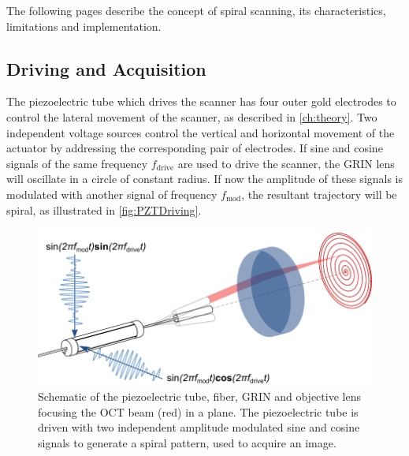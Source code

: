 The following pages describe the concept of spiral scanning, its characteristics, limitations and implementation.

\subsection{Driving and Acquisition}
The piezoelectric tube which drives the scanner has four outer gold electrodes to control the lateral movement of the scanner, as described in \autoref{ch:theory}. Two independent voltage sources control the vertical and horizontal movement of the actuator by addressing the corresponding pair of electrodes. If sine and cosine signals of the same frequency $f_\mathrm{drive}$ are used to drive the scanner, the GRIN lens will oscillate in a circle of constant radius. If now the amplitude of these signals is modulated with another signal of frequency $f_\mathrm{mod}$, the resultant trajectory will be spiral, as illustrated in \autoref{fig:PZTDriving}.

\begin{figure}[h!]\centering \includegraphics{figures/30_DesignSimulation/spiralScanning/PZTDrivingMoving.pdf}
      \caption{Schematic of the piezoelectric tube, fiber, GRIN and objective lens focusing the OCT beam (red) in a plane. 
      The piezoelectric tube is driven with two independent amplitude modulated sine and cosine signals to generate a spiral pattern, used to acquire an image. }
      \label{fig:PZTDriving}
\end{figure}

